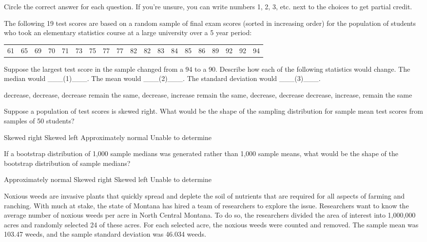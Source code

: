 \documentclass{article}
\begin{document}
	Circle the correct answer for each question.  If you're unsure, you can write numbers 1, 2, 3, etc. next to the choices to get partial credit.\\[.5cm]
	\begin{mcquestions}
		\question The following 19 test scores are based on a random sample of final exam scores (sorted in increasing order) for the population of students who took an elementary statistics course at a large university over a 5 year period:
		\begin{tabular}{ccccccccccccccccccc}
			61 &  65 &  69  & 70  & 71 &  73  & 75 &  77 &  77 &  82  & 82 &  83 &  84 &  85 &  86 &  89 &  92  & 92 &  94
		\end{tabular}
		Suppose the largest test score in the sample changed from a 94 to a 90. Describe how each of the following statistics would change.
		The median would \_\_\_(1)\_\_\_.
		The mean would \_\_\_(2)\_\_\_.
		The standard deviation would \_\_\_(3)\_\_\_.
		
		\begin{mcanswerslist}
			\answer decrease, decrease, decrease
			\answer remain the same, decrease, increase
			\answer[correct] remain the same, decrease, decrease
			\answer decrease, increase, remain the same			
		\end{mcanswerslist}
		
		\question Suppose a population of test scores is skewed right. What would be the shape of the sampling distribution for sample mean test scores from samples of 50 students?
		\begin{mcanswerslist}
			\answer Skewed right
			\answer Skewed left
			\answer[correct] Approximately normal
			\answer Unable to determine
		\end{mcanswerslist}
		
		\question If a bootstrap distribution of 1,000 sample medians was generated rather than 1,000 sample means, what would be the shape of the bootstrap distribution of sample medians?
		\begin{mcanswerslist}
			\answer Approximately normal
			\answer Skewed right
			\answer Skewed left
			\answer[correct] Unable to determine
		\end{mcanswerslist}
		
		\begin{mcquestioninstruction}
			Noxious weeds are invasive plants that quickly spread and deplete the soil of nutrients that are required for all aspects of farming and ranching. With much at stake, the state of Montana has hired a team of researchers to explore the issue. Researchers want to know the average number of noxious weeds per acre in North Central Montana. To do so, the researchers divided the area of interest into 1,000,000 acres and randomly selected 24 of these acres. For each selected acre, the noxious weeds were counted and removed. The sample mean was 103.47 weeds, and the sample standard deviation was 46.034 weeds.
		\end{mcquestioninstruction}
		

\end{mcquestions}
\end{document}
